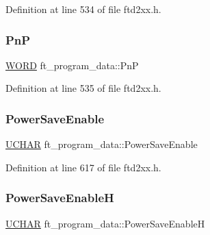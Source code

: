 Definition at line 534 of file ftd2xx.\+h.

\mbox{\label{structft__program__data_ac7072dcb805fa05b3614f000498a8aed}} 
\subsubsection{\texorpdfstring{PnP}{PnP}}
{\footnotesize\ttfamily \hyperlink{CatCaloProto40MHz_2inc_2WinTypes_8h_a197942eefa7db30960ae396d68339b97}{W\+O\+RD} ft\+\_\+program\+\_\+data\+::\+PnP}



Definition at line 535 of file ftd2xx.\+h.

\mbox{\label{structft__program__data_a84911f0b2d5a0b3e722ddeefdd4470cf}} 
\subsubsection{\texorpdfstring{Power\+Save\+Enable}{PowerSaveEnable}}
{\footnotesize\ttfamily \hyperlink{CatCaloProto40MHz_2inc_2WinTypes_8h_a4f4bb67531a9bf6f0b9c6ad76aeba587}{U\+C\+H\+AR} ft\+\_\+program\+\_\+data\+::\+Power\+Save\+Enable}



Definition at line 617 of file ftd2xx.\+h.

\mbox{\label{structft__program__data_a52194d4e0e5d8f880186dcdb507d966a}} 
\subsubsection{\texorpdfstring{Power\+Save\+EnableH}{PowerSaveEnableH}}
{\footnotesize\ttfamily \hyperlink{CatCaloProto40MHz_2inc_2WinTypes_8h_a4f4bb67531a9bf6f0b9c6ad76aeba587}{U\+C\+H\+AR} ft\+\_\+program\+\_\+data\+::\+Power\+Save\+EnableH}




